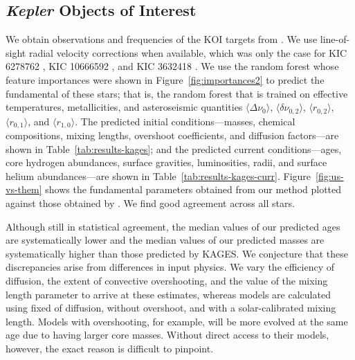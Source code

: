 \subsection{\emph{Kepler} Objects of Interest}
\label{sec:koi}
We obtain observations and frequencies of the KOI targets from \citet{2016MNRAS.456.2183D}. We use line-of-sight radial velocity corrections when available, which was only the case for KIC 6278762 \citep{2002AJ....124.1144L}, KIC 10666592 \citep{2013A&A...554A..84M}, and KIC 3632418 \citep{2006AstL...32..759G}. We use the random forest whose feature importances were shown in Figure~\ref{fig:importances2} to predict the fundamental  of these stars; that is, the random forest that is trained on effective temperatures, metallicities, and asteroseismic quantities ${\langle \Delta\nu_0 \rangle}$, ${\langle \delta\nu_{0,2} \rangle}$, ${\langle r_{0,2} \rangle}$, ${\langle r_{0,1} \rangle}$, and ${\langle r_{1,0} \rangle}$. The predicted initial conditions---masses, chemical compositions, mixing lengths, overshoot coefficients, and diffusion  factors---are shown in Table~\ref{tab:results-kages}; and the predicted current conditions---ages, core hydrogen abundances, surface gravities, luminosities, radii, and surface helium abundances---are shown in Table~\ref{tab:results-kages-curr}. Figure~\ref{fig:us-vs-them} shows the fundamental parameters obtained from our method plotted against those obtained by \citet[hereinafter KAGES]{2015MNRAS.452.2127S}. We find good agreement across all stars. 

Although still in statistical agreement, the median values of our predicted ages are systematically lower and the median values of our predicted masses are systematically higher than those predicted by KAGES. We conjecture that these discrepancies arise from differences in input physics. We vary the efficiency of diffusion, the extent of convective overshooting, and the value of the mixing length parameter to arrive at these estimates, whereas  models are calculated using fixed  of diffusion, without overshoot, and with a solar-calibrated mixing length. Models with overshooting, for example, will be more evolved at the same age due to having larger core masses. Without direct access to their models, however, the exact reason is difficult to pinpoint. 

